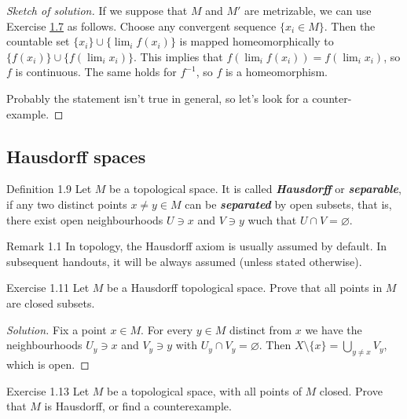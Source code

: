 \begin{proof}[Sketch of solution]\leavevmode
	If we suppose that $M$ and $M'$ are metrizable, we can use Exercise \hyperref[exer:1.7]{1.7} as follows. Choose any convergent sequence $\{x_i \in M\}$. Then the countable set  $\{x_i\}\cup \{\lim_{i} f(x_i)\}$ is mapped homeomorphically to $\{f(x_i)\}\cup  \{f(\lim_{i} x_i)\}$. This implies that $f\left( \lim_{i} f(x_i) \right) =f \left( \lim_{i} x_i \right)$, so $f$ is continuous. The same holds for $f^{-1}$, so $f$ is a homeomorphism.

	Probably the statement isn't true in general, so let's look for a counter-example.
\end{proof}

\subsection{Hausdorff spaces}

\begin{thing3}{Definition 1.9}\leavevmode
	Let $M$ be a topological space. It is called \textit{\textbf{Hausdorff}} or \textit{\textbf{separable}}, if any two distinct points $x \neq  y \in M$ can be \textit{\textbf{separated}} by open subsets, that is, there exist open neighbourhoods $U \ni x$ and $V \ni y$ wuch that $U\cap V= \varnothing$.
\end{thing3}

\begin{thing5}{Remark 1.1}\leavevmode
	In topology, the Hausdorff axiom is usually assumed by default. In subsequent handouts, it will be always assumed (unless stated otherwise).
\end{thing5}

\begin{thing4}{Exercise 1.11}\leavevmode
	Let $M$ be a Hausdorff topological space. Prove that all points in $M$ are closed subsets.
\end{thing4}

\begin{proof}[Solution]\leavevmode
Fix a point $x \in M$. For every $y \in M$ distinct from $x$ we have the neighbourhoods $U_y \ni x$ and $V_y \ni y$ with $U_y \cap V_y = \varnothing$. Then $X\setminus\{x\}=\bigcup_{y \neq x} V_y$, which is open.
\end{proof}

\begin{thing4}{Exercise 1.13}\leavevmode
	Let $M$ be a topological space, with all points of $M$ closed. Prove that $M$ is Hausdorff, or find a counterexample.
\end{thing4}

